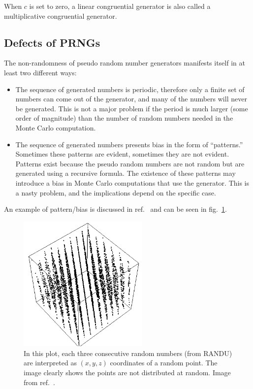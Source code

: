 \documentclass[justified,sixbynine]{tufte-book}
\theoremstyle{plain}%
\theoremstyle{definition}
\theoremstyle{remark}
\begin{document}
\begin{fullwidth}
When $c$ is set to zero, a linear congruential generator is also called a multiplicative congruential generator.

\goodbreak\subsection{Defects of PRNGs}

The non-randomness of pseudo random number generators manifests itself in at
least two different ways:

\begin{itemize}
\item  The sequence of generated numbers is periodic, therefore only a finite
set of numbers can come out of the generator, and many of the numbers will never be
generated. This is not a major problem if the period is much larger (some
order of magnitude) than the number of random numbers needed in the Monte
Carlo computation.

\item  The sequence of generated numbers presents bias in the form of
``patterns.'' Sometimes
these patterns are evident, sometimes they are not evident. Patterns exist
because the pseudo random numbers are not random but are generated using a
recursive formula. The existence of these patterns may introduce a bias in
Monte Carlo computations that use the generator. This is a nasty problem, and
the implications depend on the specific case.
\end{itemize}

An example of pattern/bias is discussed in ref.~\cite{randu} and can be seen in fig.~\ref{randu}.

\begin{figure}[ht]
  \centering\includegraphics[width=2.5in]{images/randu.png}
\caption{In this plot, each three consecutive random numbers (from RANDU) are interpreted as $(x,y,z)$ coordinates of a random point. The image clearly shows the points are not distributed at random. Image from ref.~\cite{randu}.\label{randu}}
\end{figure}


\end{fullwidth}
\end{document}
